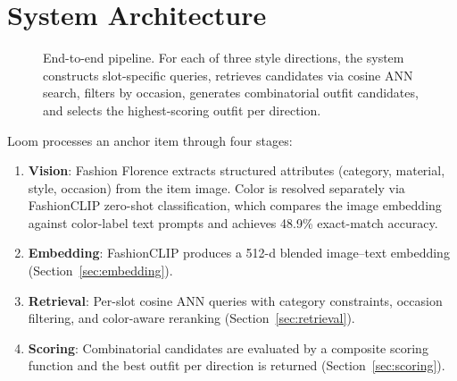 \documentclass[10pt,twocolumn]{article}
\begin{document}
\section{System Architecture}
\label{sec:architecture}

\begin{figure}[t]
\centering
{}
\caption{End-to-end pipeline.  For each of three style directions, the
system constructs slot-specific queries, retrieves candidates via cosine ANN
search, filters by occasion, generates combinatorial outfit candidates, and
selects the highest-scoring outfit per direction.}
\label{fig:pipeline}
\end{figure}

Loom processes an anchor item through four stages:

\begin{enumerate}[leftmargin=*,topsep=2pt,itemsep=1pt]
\item \textbf{Vision}: Fashion Florence \citep{berlia2026florence} extracts
  structured attributes (category, material, style, occasion) from the
  item image.  Color is resolved separately via FashionCLIP zero-shot
  classification, which compares the image embedding against color-label
  text prompts and achieves 48.9\% exact-match accuracy.
\item \textbf{Embedding}: FashionCLIP produces a 512-d blended
  image--text embedding (Section~\ref{sec:embedding}).
\item \textbf{Retrieval}: Per-slot cosine ANN queries with category
  constraints, occasion filtering, and color-aware reranking
  (Section~\ref{sec:retrieval}).
\item \textbf{Scoring}: Combinatorial candidates are evaluated by
  a composite scoring function and the best outfit per direction is returned
  (Section~\ref{sec:scoring}).
\end{enumerate}
\end{document}
